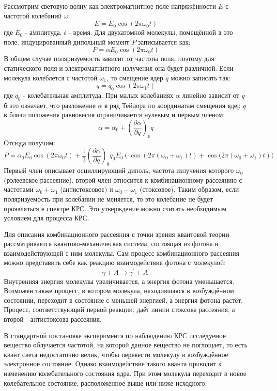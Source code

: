 \documentclass{article}
\begin{document}
Рассмотрим световую волну как электромагнитное поле напряжённости $E$ с частотой колебаний $\omega$:
\[E = E_0\cos{(2\pi\omega_0t)}\]
где $E_0$ - амплитуда, $t$ - время. Для двухатомной молекулы, помещённой в это поле, индуцированный дипольный момент $P$ записывается как:
\[P = \alpha E_0\cos{(2\pi\omega_0t)}\]
В общем случае поляризуемость зависит от частоты поля, поэтому для статического поля и электромагнитного излучения она будет различной. Если молекула колеблется с частотой $\omega_1$, то смещение ядер $q$ можно записать так:
\[q = q_0\cos{(2\pi\omega_1t)}\]
где $q_0$ - колебательная амплитуда. При малых колебаниях $\alpha$ линейно зависит от $q$б это означает, что разложение $\alpha$ в ряд Тейлора по координатам смещения ядер $q$ в близи положения равновесия ограничивается нулевым и первым членом:
\[\alpha = \alpha_0 + \left(\frac{\partial\alpha}{\partial q}\right)_0q\]
Отсюда получим:
\[P = \alpha_0E_0\cos{(2\pi\omega_0t)} + \frac{1}{2}\left(\frac{\partial\alpha}{\partial q}\right)_0q_0E_0(\cos{(2\pi(\omega_0 + \omega_1)t)} + \cos{(2\pi(\omega_0 + \omega_1)t}))\]
Первый член описывает осциллирующий диполь, частота излучения которого $\omega_0$ (рэлеевское рассеяние), второй член относится к комбинационному рассеянию с частотами $\omega_0 + \omega_1$ (антистоксовое) и $\omega_0 - \omega_1$ (стоксовое). Таким образом, если поляризуемость при колебании не меняется, то это колебание не будет проявляться в спектре КРС. Это утверждение можно считать необходимым условием для процесса КРС.

Для описания комбинационного рассеяния с точки зрения квантовой теории рассматривается квантово-механическая система, состоящая из фотона и взаимодействующей с ним молекулы. Сам процесс комбинационного рассеяния можно представить себе как реакцию взаимодействия фотона с молекулой:
\[\gamma + A \xrightarrow{}\gamma^{'} + A^{'}\]
Внутренняя энергия молекулы увеличивается, а энергия фотона уменьшается. Возможен также процесс, в котором молекула, находившаяся в возбуждённом состоянии, переходит в состояние с меньшей энергией, а энергия фотона растёт. Процесс, соответствующий первой реакции, даёт линии стоксова рассеяния, а второй - антистоксова рассеяния.

В стандартной постановке эксперимента по наблюдению КРС исследуемое вещество облучается частотой, на которой данное вещество не поглощает, то есть квант света недостаточно велик, чтобы перевести молекулу в возбуждённое электронное состояние. Однако взаимодействие такого кванта приводит к изменению колебательного состояния ядра. При этом молекула переходит в новое колебательное состояние, расположенное выше или ниже исходного.
\end{document}
